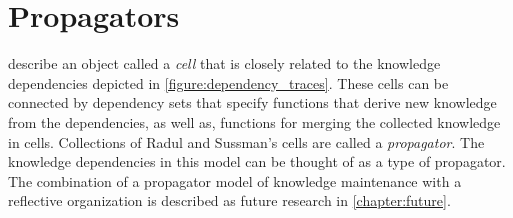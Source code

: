 \section{Propagators}

\cite{radul_and_sussman:2009} describe an object called a \emph{cell}
that is closely related to the knowledge dependencies depicted in
{\mbox{\autoref{figure:dependency_traces}}}.  These cells can be
connected by dependency sets that specify functions that derive new
knowledge from the dependencies, as well as, functions for merging the
collected knowledge in cells.  Collections of Radul and Sussman's
cells are called a \emph{propagator}.  The knowledge dependencies in
this model can be thought of as a type of propagator.  The combination
of a propagator model of knowledge maintenance with a reflective
organization is described as future research in
\autoref{chapter:future}.
